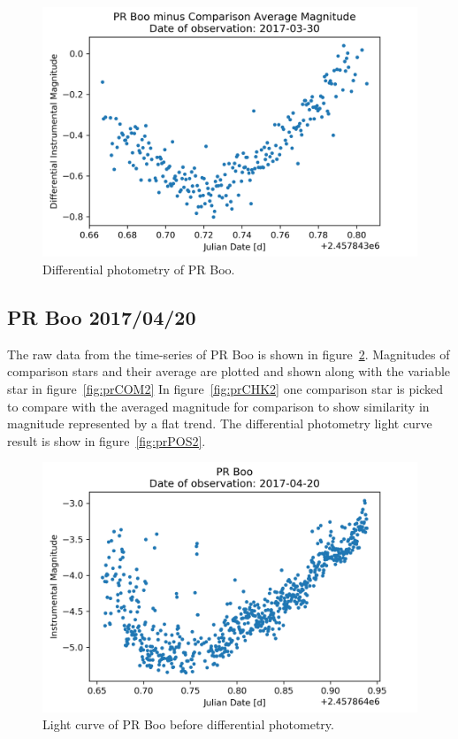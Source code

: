 \begin{figure}[h]
    \centering
    \includegraphics{figures/prboo170330POS.png}
    \caption{Differential photometry of PR Boo.}
\label{fig:prPOS}
\end{figure}

\subsection{PR Boo 2017/04/20}
The raw data from the time-series of PR Boo is shown in figure~\ref{fig:prRAW2}.
Magnitudes of comparison stars and their average are plotted and shown along with the variable star in figure~\ref{fig:prCOM2}
In figure~\ref{fig:prCHK2} one comparison star is picked to compare with the averaged magnitude for comparison to show similarity
in magnitude represented by a flat trend.
The differential photometry light curve result is show in figure~\ref{fig:prPOS2}.
\begin{figure}[h]
    \centering
    \includegraphics{figures/prboo170420RAW.png}
    \caption{Light curve of PR Boo before differential photometry.}
\label{fig:prRAW2}
\end{figure}

